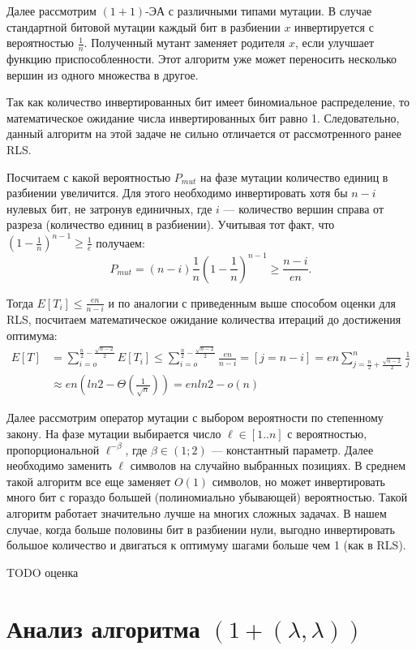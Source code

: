 \documentclass[times]{itmo-student-thesis}
\newcommand{\alglambda}{${(1 + (\lambda , \lambda))}$\xspace}
\newcommand{\oea}{\mbox{$(1 + 1)$-ЭА}\xspace}
\begin{document}
Далее рассмотрим \oea с различными типами мутации. В случае стандартной битовой мутации каждый бит в разбиении $x$ инвертируется с вероятностью $\frac{1}{n}$.
Полученный мутант заменяет родителя $x$, если улучшает функцию приспособленности.
Этот алгоритм уже может переносить несколько вершин из одного множества в другое.

Так как количество инвертированных бит имеет биномиальное распределение, то математическое ожидание числа инвертированных бит равно 1.
Следовательно, данный алгоритм на этой задаче не сильно отличается от рассмотренного ранее RLS.

Посчитаем с какой вероятностью $P_{mut}$ на фазе мутации количество единиц в разбиении увеличится. Для этого необходимо инвертировать хотя бы $n - i$ нулевых бит, не затронув единичных, где $i$ --- количество вершин справа от разреза (количество единиц в разбиении).
Учитывая тот факт, что
$ (1 - \frac{1}{n})^{n-1} \ge \frac{1}{e}$
получаем:
$$
  P_{mut} = (n-i)\frac{1}{n}\left(1 - \frac{1}{n}\right)^{n-1} \ge \frac{n-i}{en}.
$$

Тогда $E[T_i] \leq \frac{en}{n-i}$ и по аналогии с приведенным выше способом оценки для RLS, посчитаем математическое ожидание количества итераций до достижения оптимума:
\begin{align*}
  E[T] &=
              \sum_{i=o}^{\frac{n}{2} - \frac{\sqrt{n-2}}{2}} E[T_i] \leq
              \sum_{i=o}^{\frac{n}{2} - \frac{\sqrt{n-2}}{2}} \frac{en}{n-i} = [j = n - i] = en \sum_{j=\frac{n}{2} + \frac{\sqrt{n-2}}{2}}^{n} \frac{1}{j}  \\
      &\approx
              en\left(ln2 - \Theta\left(\frac{1}{\sqrt{n}}\right)\right) = en ln2 - o(n)
\end{align*}

Далее рассмотрим оператор мутации с выбором вероятности по степенному закону. На фазе мутации выбирается число $\ell \in [1..n]$ с вероятностью, пропорциональной $\ell^{-\beta}$, где $\beta \in (1; 2)$ --- константный параметр.
Далее необходимо заменить $\ell$ символов на случайно выбранных позициях.
В среднем такой алгоритм все еще заменяет $O(1)$ символов, но может инвертировать много бит с гораздо большей (полиномиально убывающей) вероятностью.
Такой алгоритм работает значительно лучше на многих сложных задачах.
В нашем случае, когда больше половины бит в разбиении нули, выгодно инвертировать большое количество и двигаться к оптимуму шагами больше чем 1 (как в RLS).

TODO оценка

\section{Анализ алгоритма \alglambda}
\end{document}
